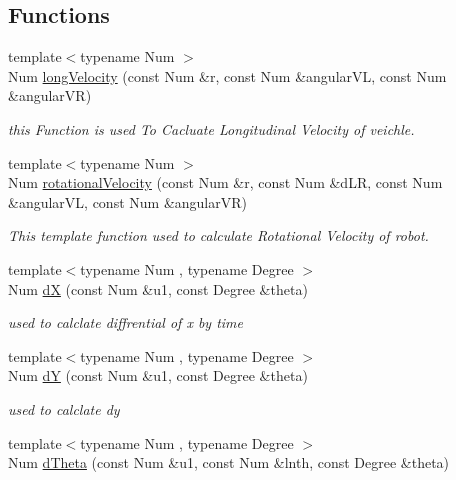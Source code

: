 \subsection*{Functions}
\begin{DoxyCompactItemize}
\item 
{\footnotesize template$<$typename Num $>$ }\\Num \hyperlink{namespace_path_1_1_kinematic_models_aaea8f9ef18514642886a2a79bb862202}{long\+Velocity} (const Num \&r, const Num \&angular\+VL, const Num \&angular\+VR)
\begin{DoxyCompactList}\small\item\em this Function is used To Cacluate Longitudinal Velocity of veichle. \end{DoxyCompactList}\item 
{\footnotesize template$<$typename Num $>$ }\\Num \hyperlink{namespace_path_1_1_kinematic_models_a340b21962938fd668f09d8cc538e3533}{rotational\+Velocity} (const Num \&r, const Num \&d\+LR, const Num \&angular\+VL, const Num \&angular\+VR)
\begin{DoxyCompactList}\small\item\em This template function used to calculate Rotational Velocity of robot. \end{DoxyCompactList}\item 
{\footnotesize template$<$typename Num , typename Degree $>$ }\\Num \hyperlink{namespace_path_1_1_kinematic_models_a552124dfc86f88feab9d659464ab2c3d}{dX} (const Num \&u1, const Degree \&theta)
\begin{DoxyCompactList}\small\item\em used to calclate diffrential of x by time \end{DoxyCompactList}\item 
{\footnotesize template$<$typename Num , typename Degree $>$ }\\Num \hyperlink{namespace_path_1_1_kinematic_models_a11aaf1219f56249da986fe9e06942d22}{dY} (const Num \&u1, const Degree \&theta)
\begin{DoxyCompactList}\small\item\em used to calclate dy \end{DoxyCompactList}\item 
{\footnotesize template$<$typename Num , typename Degree $>$ }\\Num \hyperlink{namespace_path_1_1_kinematic_models_a854b3503bce18b979159dee90ee1db0d}{d\+Theta} (const Num \&u1, const Num \&lnth, const Degree \&theta)

\end{DoxyCompactItemize}

